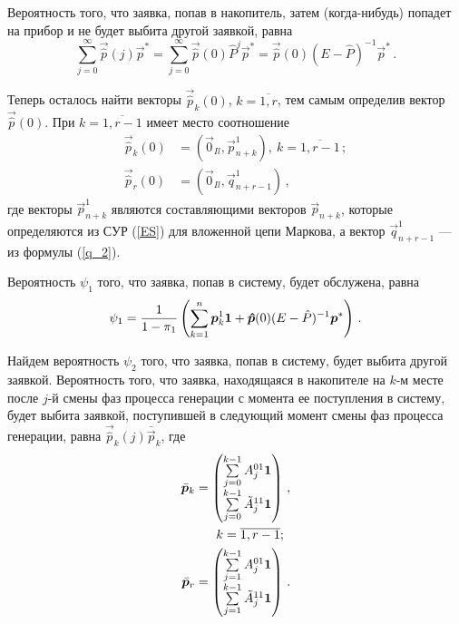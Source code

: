 \begin{multicols}{2}
Вероятность того, что заявка, попав в накопитель, затем (когда-нибудь) попадет на прибор
и не будет выбита другой заявкой, равна
$$
\sum\limits_{j=0}^{\infty} \vec{\hat p}(j) \vec{p}^*=
\sum\limits_{j=0}^{\infty} \vec{\hat p}(0) \hat P^{j} \vec{p}^*=
\vec{\hat p}(0) (E-\hat P)^{-1} \vec{p}^*\,.
$$

Теперь осталось найти векторы $\vec{\hat p}_k(0)$, $k=\overline{1,r}$,
тем самым определив вектор $\vec{\hat p}(0)$.
При $k=\overline{1,r-1}$ имеет место соотношение
\begin{align}
\label{hat_vec_p_1}
\vec{\hat p}_k(0)&=({\vec 0}_{Il},\vec{p}^1_{n+k}), \ k=\overline{1,r-1}\,;
\\
\label{hat_vec_p_2}
\vec{\hat p}_r(0)&=({\vec 0}_{Il},\vec{q}^1_{n+r-1})\,,
\end{align}
где векторы $\vec{p}^1_{n+k}$ являются составляющими векторов $\vec{p}_{n+k}$,
которые определяются из СУР (\ref{ES}) для вложенной цепи Маркова,
а вектор $\vec{q}^1_{n+r-1}$ --- из формулы (\ref{q_2}).

Вероятность $\psi_1$ того, что заявка, попав в систему, будет обслужена, равна
\begin{equation}
\label{psi_1}
\psi_1=\fr{1}{1-\pi_1}\left(\sum\limits_{k=1}^{n} \vec{p}^1_{k}{\bf 1}+
\vec{\hat p}(0) (E-\hat P)^{-1} \vec{p}^*\right)\,.
\end{equation}

Найдем вероятность $\psi_2$ того, что заявка, попав в систему, будет выбита другой заявкой.
Вероятность того, что заявка, находящаяся в накопителе на $k$-м месте после $j$-й смены фаз процесса генерации
с момента ее поступления в систему, будет выбита заявкой,
поступившей в следующий момент смены фаз процесса генерации, равна
$
\vec{\hat p}_{k}(j) \bar{\vec{p}}_k$, где
\begin{align*}
\bar{\vec{p}}_k&=
\begin{pmatrix}
\sum\limits_{j=0}^{k-1} A^{01}_{j}{\bf 1}\\[6pt]
\sum\limits_{j=0}^{k-1} \Tilde A^{11}_{j} {\bf 1}\\
\end{pmatrix}\,,\\
&\ \ \ \ \  k=\overline{1,r-1};\\
 \bar{\vec{p}}_r &=
\begin{pmatrix}
\sum\limits_{j=1}^{k-1} A^{01}_{j}{\bf 1}\\[6pt]
\sum\limits_{j=1}^{k-1} \Tilde A^{11}_{j} {\bf 1}\\
\end{pmatrix}\,.
\end{align*}


\end{multicols}
